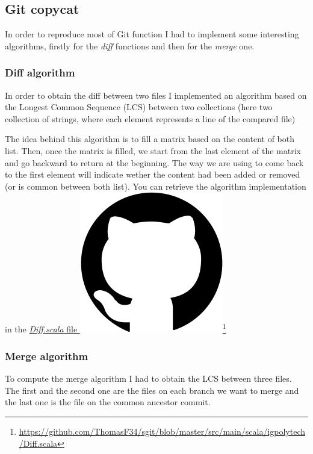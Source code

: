 \documentclass[11pt]{article}
\begin{document}
\subsection{Git copycat}

In order to reproduce most of Git function I had to implement some interesting algorithms, firstly for the \textit{diff} functions and then for the \textit{merge} one.

\subsubsection{Diff algorithm}
In order to obtain the diff between two files I implemented an algorithm based on the Longest Common Sequence (LCS) between two collections (here two collection of strings, where each element represents a line of the compared file)

The idea behind this algorithm is to fill a matrix based on the content of both list. Then, once the matrix is filled, we start from the last element of the matrix and go backward to return at the beginning. The way we are using to come back to the first element will indicate wether the content had been added or removed (or is common between both list). You can retrieve the algorithm implementation in the \href{https://github.com/ThomasF34/sgit/blob/master/src/main/scala/igpolytech/Diff.scala}{\textit{Diff.scala} file \includegraphics[height=\fontcharht\font`\l]{img/github.png}}\footnote{\href{https://github.com/ThomasF34/sgit/blob/master/src/main/scala/igpolytech/Diff.scala}{\ul{https://github.com/ThomasF34/sgit/blob/master/src/main/scala/igpolytech/Diff.scala}}}

\subsubsection{Merge algorithm}
To compute the merge algorithm I had to obtain the LCS between three files. The first and the second one are the files on each branch we want to merge and the last one is the file on the common ancestor commit.
\end{document}
